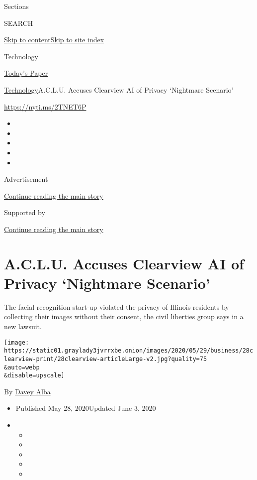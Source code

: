 Sections

SEARCH

\protect\hyperlink{site-content}{Skip to
content}\protect\hyperlink{site-index}{Skip to site index}

\href{https://www.nytimes3xbfgragh.onion/section/technology}{Technology}

\href{https://myaccount.nytimes3xbfgragh.onion/auth/login?response_type=cookie\&client_id=vi}{}

\href{https://www.nytimes3xbfgragh.onion/section/todayspaper}{Today's
Paper}

\href{/section/technology}{Technology}\textbar{}A.C.L.U. Accuses
Clearview AI of Privacy `Nightmare Scenario'

\url{https://nyti.ms/2TNET6P}

\begin{itemize}
\item
\item
\item
\item
\item
\end{itemize}

Advertisement

\protect\hyperlink{after-top}{Continue reading the main story}

Supported by

\protect\hyperlink{after-sponsor}{Continue reading the main story}

\hypertarget{aclu-accuses-clearview-ai-of-privacy-nightmare-scenario}{%
\section{A.C.L.U. Accuses Clearview AI of Privacy `Nightmare
Scenario'}\label{aclu-accuses-clearview-ai-of-privacy-nightmare-scenario}}

The facial recognition start-up violated the privacy of Illinois
residents by collecting their images without their consent, the civil
liberties group says in a new lawsuit.

\texttt{[image: https://static01.graylady3jvrrxbe.onion/images/2020/05/29/business/28clearview-print/28clearview-articleLarge-v2.jpg?quality=75\\\&auto=webp\\\&disable=upscale]}

By \href{https://www.nytimes3xbfgragh.onion/by/davey-alba}{Davey Alba}

\begin{itemize}
\item
  Published May 28, 2020Updated June 3, 2020
\item
  \begin{itemize}
  \item
  \item
  \item
  \item
  \item
  \end{itemize}
\end{itemize}

